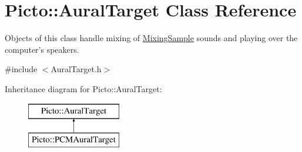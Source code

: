 \hypertarget{class_picto_1_1_aural_target}{\section{Picto\-:\-:Aural\-Target Class Reference}
\label{class_picto_1_1_aural_target}
}


Objects of this class handle mixing of \hyperlink{class_picto_1_1_mixing_sample}{Mixing\-Sample} sounds and playing over the computer's speakers.  




{\ttfamily \#include $<$Aural\-Target.\-h$>$}

Inheritance diagram for Picto\-:\-:Aural\-Target\-:\begin{figure}[H]
\begin{center}
\leavevmode
\includegraphics[height=2.000000cm]{class_picto_1_1_aural_target}
\end{center}
\end{figure}
